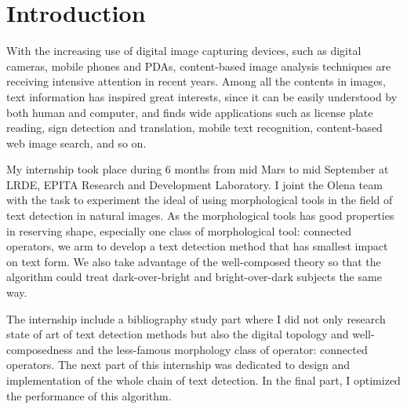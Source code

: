 
\graphicspath{ {1chapterIntroduction/image/} }
\chapter{Introduction}

With the increasing use of digital image capturing devices, such as digital cameras, mobile phones and PDAs, content-based image analysis techniques are receiving intensive attention in recent years. Among all the contents in images, text information has inspired great interests, since it can be easily understood by both human and computer, and finds
wide applications such as license plate reading, sign detection and translation, mobile text recognition, content-based web image search, and so on.


My internship took place during 6 months from mid Mars to mid September at LRDE, EPITA Research and Development Laboratory. I joint the Olena team with the task to experiment the ideal of using morphological tools in the field of text detection in natural images. As the morphological tools has good properties in reserving shape, especially one class of morphological tool: connected operators, we arm to develop a text detection method that has smallest impact on text form. We also take advantage of the well-composed theory so that the algorithm could treat dark-over-bright and bright-over-dark subjects the same way.


The internship include a bibliography study part where I did not only research state of art of text detection methods but also the digital topology and well-composedness and the less-famous morphology class of operator: connected operators. The next part of this internship was dedicated to design and implementation of the whole chain of text detection. In the final part, I optimized the performance of this algorithm.